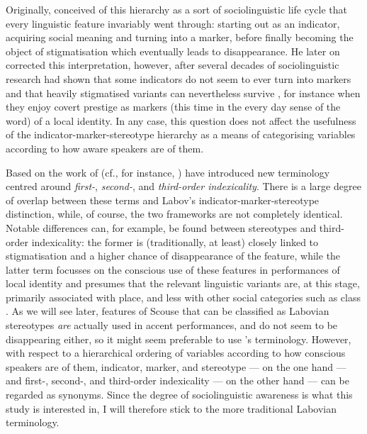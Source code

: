 Originally, \citeauthor{labov1972} conceived of this hierarchy as a sort of sociolinguistic life cycle that every linguistic feature invariably went through: starting out as an indicator, acquiring social meaning and turning into a marker, before finally becoming the object of stigmatisation which eventually leads to disappearance.
He later on corrected this interpretation, however, after several decades of sociolinguistic research had shown that some indicators do not seem to ever turn into markers and that heavily stigmatised variants can nevertheless survive \parencite{labov1994}, for instance when they enjoy covert prestige as markers (this time in the every day sense of the word) of a local identity.
In any case, this question does not affect the usefulness of the indicator-marker-stereotype hierarchy as a means of categorising variables according to how aware speakers are of them.

Based on the work of \citeauthor{silverstein2003} (cf., for instance, \citealt{silverstein2003}) \textcite[cf.][78]{johnstoneetal2006} have introduced new terminology centred around \emph{first-}, \emph{second-}, and \emph{third-order indexicality}.
There is a large degree of overlap between these terms and Labov's indicator-marker-stereotype distinction, while, of course, the two frameworks are not completely identical.
Notable differences can, for example, be found between stereotypes and third-order indexicality: the former is (traditionally, at least) closely linked to stigmatisation and a higher chance of disappearance of the feature, while the latter term focusses on the conscious use of these features in performances of local identity and presumes that the relevant linguistic variants are, at this stage, primarily associated with place, and less with other social categories such as class \parencite[cf.][81--84]{johnstoneetal2006}.
As we will see later, features of Scouse that can be classified as Labovian stereotypes \emph{are} actually used in accent performances, and do not seem to be disappearing either, so it might seem preferable to use \citeauthor{johnstoneetal2006}'s terminology.
However, with respect to a hierarchical ordering of variables according to how conscious speakers are of them, indicator, marker, and stereotype --- on the one hand --- and first-, second-, and third-order indexicality --- on the other hand --- can be regarded as synonyms.
Since the degree of sociolinguistic awareness is what this study is interested in, I will therefore stick to the more traditional Labovian terminology.

